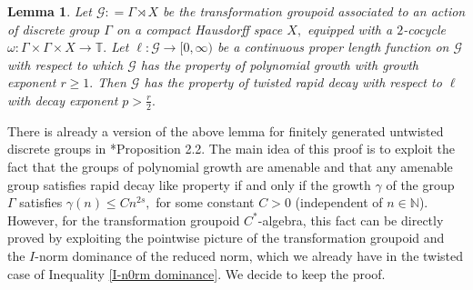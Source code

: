 \documentclass[a4paper,11pt,reqno]{amsart}
\theoremstyle{plain}
\newtheorem{lem}[thm]{Lemma}
\theoremstyle{mainthmstyle}
\theoremstyle{named}
\numberwithin{equation}{section}
\begin{document}
\begin{lem}
\label{polytorapid}
Let $\mathcal G : = \Gamma \rtimes X$ be the transformation groupoid associated to an action of discrete group $\Gamma$ on a compact Hausdorff space $X,$ equipped with a $2$-cocycle $\omega : \Gamma \times \Gamma \times X \rightarrow \mathbb T.$ Let $\ell : \mathcal G \rightarrow [0, \infty)$ be a continuous proper length function on $\mathcal G$ with respect to which $\mathcal G$ has the property of polynomial growth with growth exponent $r \geq 1.$ Then $\mathcal G$ has the property of twisted rapid decay with respect to $\ell$ with decay exponent $p > \frac {r} {2}.$
\end{lem}
There is already a version of the above lemma for finitely generated untwisted discrete groups in \cite{nica2010degree}*{Proposition 2.2}. The main idea of this proof is to exploit the fact that the groups of polynomial growth are amenable and that any amenable group satisfies rapid decay like property if and only if the growth $\gamma$ of the group $\Gamma$ satisfies $\gamma (n) \leq C n^{2 s},$ for some constant $C > 0$ (independent of $n \in \mathbb N$). However, for the transformation groupoid $C^{\ast}$-algebra, this fact can be directly proved by exploiting the pointwise picture of the transformation groupoid and the $I$-norm dominance of the reduced norm, which we already have in the twisted case of Inequality \ref{I-n0rm dominance}. We decide to keep the proof.
\end{document}
